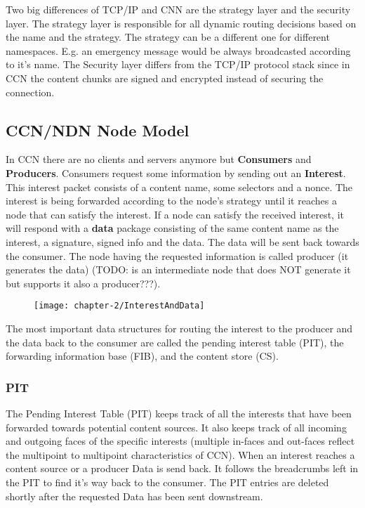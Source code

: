 \vspace{5mm} %

Two big differences of TCP/IP and CNN are the strategy layer and the security layer. The strategy layer is responsible for all dynamic routing decisions based on the name and the strategy. The strategy can be a different one for different namespaces. E.g. an emergency message would be always broadcasted according to it's name. The Security layer differs from the TCP/IP protocol stack since in CCN the content chunks are signed and encrypted instead of securing the connection.

\subsection{CCN/NDN Node Model}

In CCN there are no clients and servers anymore but \textbf{Consumers} and \textbf{Producers}. Consumers request some information by sending out an \textbf{Interest}. This interest packet consists of a content name, some selectors and a nonce. The interest is being forwarded according to the node's strategy until it reaches a node that can satisfy the interest. If a node can satisfy the received interest, it will respond with a \textbf{data} package consisting of the same content name as the interest, a signature, signed info and the data. The data will be sent back towards the consumer. The node having the requested information is called producer (it generates the data) (TODO: is an intermediate node that does NOT generate it but supports it also a producer???).

\begin{figure}[H]
\texttt{[image: chapter-2/InterestAndData]}
\centering
\end{figure}

The most important data structures for routing the interest to the producer and the data back to the consumer are called the pending interest table (PIT), the forwarding information base (FIB), and the content store (CS).

\subsubsection{PIT}

The Pending Interest Table (PIT) keeps track of all the interests that have been forwarded towards potential content sources. It also keeps track of all incoming and outgoing faces of the specific interests (multiple in-faces and out-faces reflect the multipoint to multipoint characteristics of CCN). When an interest reaches a content source or a producer Data is send back. It follows the breadcrumbs left in the PIT to find it's way back to the consumer. The PIT entries are deleted shortly after the requested Data has been sent downstream.

